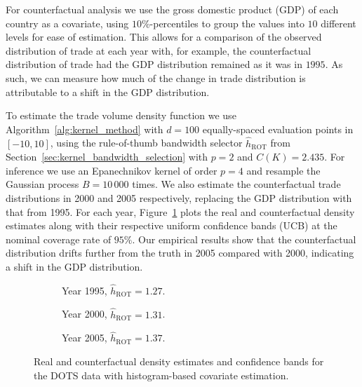 \documentclass[11pt,lof]{puthesis}
\DeclareMathOperator{\ROT}{ROT}
\theoremstyle{break}
\theoremstyle{proof}
\begin{document}
For counterfactual analysis we use the gross domestic product (GDP) of each
country as a covariate, using $10\%$-percentiles to group the values into $10$
different levels for ease of estimation. This allows for a comparison of the
observed distribution of trade at each year with, for example, the
counterfactual distribution of trade had the GDP distribution remained as it
was in $1995$. As such, we can measure how much of the change in trade
distribution is attributable to a shift in the GDP distribution.

To estimate the trade volume density function we use
Algorithm~\ref{alg:kernel_method}
with $d=100$ equally-spaced evaluation points in $[-10,10]$, using the
rule-of-thumb bandwidth selector $\hat h_{\ROT}$ from
Section~\ref{sec:kernel_bandwidth_selection} with $p=2$ and $C(K) = 2.435$. For
inference we use an Epanechnikov kernel of order $p=4$ and resample the
Gaussian process $B = 10\,000$ times. We also estimate the counterfactual trade
distributions in 2000 and 2005 respectively, replacing the GDP distribution
with that from 1995. For each year, Figure~\ref{fig:kernel_trade} plots the
real and
counterfactual density estimates along with their respective uniform confidence
bands (UCB) at the nominal coverage rate of $95\%$. Our empirical results show
that the counterfactual distribution drifts further from the truth in 2005
compared with 2000, indicating a shift in the GDP distribution.

\begin{figure}[t]
\centering
%
\begin{subfigure}{0.32\textwidth}
\centering
\caption{Year 1995, $\hat h_{\ROT} = 1.27$.}
\end{subfigure}
%
\begin{subfigure}{0.32\textwidth}
\centering
\caption{Year 2000, $\hat h_{\ROT} = 1.31$.}
\end{subfigure}
%
\begin{subfigure}{0.32\textwidth}
\centering
\caption{Year 2005, $\hat h_{\ROT} = 1.37$.}
\end{subfigure}
%
\caption[Histogram-based estimation and inference for the DOTS data]{
Real and counterfactual density estimates and confidence bands for
the DOTS data with histogram-based covariate estimation.}
%
\label{fig:kernel_trade}
%
\end{figure}
\end{document}
